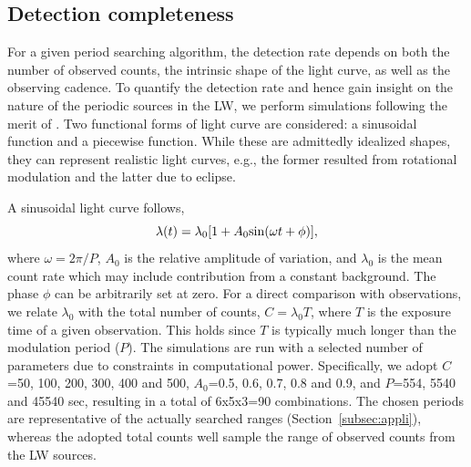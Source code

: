 \documentclass[fleqn,usenatbib]{mnras}
\begin{document}


\subsection{Detection completeness}\label{subsec:simulation}
For a given period searching algorithm, the detection rate depends on both the number of observed counts, the intrinsic shape of the light curve, as well as the observing cadence. 
To quantify the detection rate and hence gain insight on the nature of the periodic sources in the LW, we perform simulations following the merit of \citet{1998ApJ...498..666C}. 
Two functional forms of light curve are considered: a sinusoidal function and a piecewise function. While these are admittedly idealized shapes, they can represent realistic light curves, e.g., the former resulted from rotational modulation and the latter due to eclipse. 

A sinusoidal light curve follows,
\begin{equation}
\lambda (t)=\lambda_0[1+A_{0}{\rm sin}(\omega t+\phi)], 
\label{eqn:sin}
\end{equation}
where $\omega = 2{\pi}/P$, $A_0$ is the relative amplitude of variation, and $\lambda_0$ is the mean count rate which may include contribution from a constant background. The phase $\phi$ can be arbitrarily set at zero.
For a direct comparison with observations, we relate $\lambda_0$ with the total number of counts, $C = \lambda_0 T$, where $T$ is the exposure time of a given observation. This holds since $T$ is typically much longer than the modulation period ($P$). 
The simulations are run with a selected number of parameters due to constraints in computational power. 
Specifically, we adopt $C$=50, 100, 200, 300, 400 and 500, $A_0$=0.5, 0.6, 0.7, 0.8 and 0.9, and $P$=554, 5540 and 45540 sec, resulting in a total of 6x5x3=90 combinations. 
The chosen periods are representative of the actually searched ranges (Section~\ref{subsec:appli}), whereas
the adopted total counts well sample the range of observed counts from the LW sources.
\end{document}
